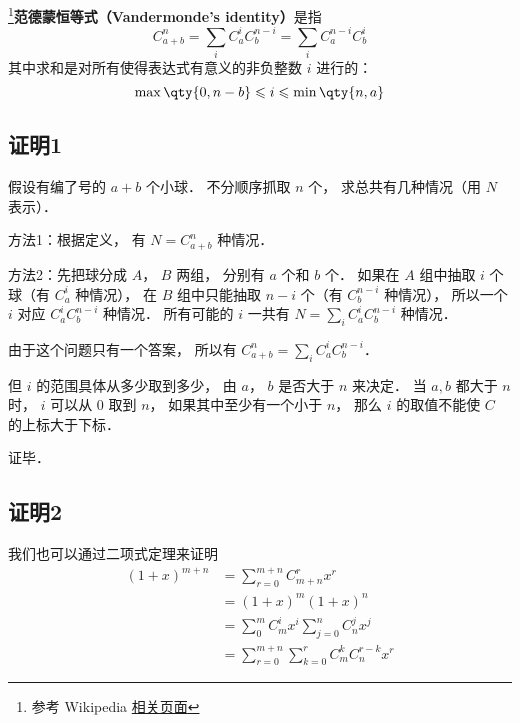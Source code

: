 

\footnote{参考 Wikipedia \href{https://en.wikipedia.org/wiki/Vandermonde's_identity}{相关页面}}\textbf{范德蒙恒等式（Vandermonde's identity）}是指
\begin{equation}
C_{a + b}^n = \sum_i C_a^i C_b^{n-i} = \sum\limits_i C_a^{n-i}C_b^i
\end{equation}
其中求和是对所有使得表达式有意义的非负整数 $i$ 进行的：
\begin{equation}
\max\qty{0, n-b} \leqslant i \leqslant \min\qty{n, a}
\end{equation}

\subsection{证明1}

假设有编了号的 $a+b$ 个小球． 不分顺序抓取 $n$ 个， 求总共有几种情况（用 $N$ 表示）．

方法1：根据定义， 有 $N = C_{a+b}^n$ 种情况．

方法2：先把球分成 $A$，  $B$ 两组， 分别有 $a$ 个和 $b$ 个． 如果在 $A$ 组中抽取 $i$ 个球（有 $C_a^i$ 种情况）， 在 $B$ 组中只能抽取  $n - i$ 个（有 $C_b^{n-i}$ 种情况）， 所以一个 $i$ 对应 $C_a^i C_b^{n-i}$ 种情况． 所有可能的 $i$ 一共有 $N = \sum_i C_a^i C_b^{n-i}$ 种情况．

由于这个问题只有一个答案， 所以有 $C_{a+b}^n = \sum_i C_a^i C_b^{n-i}$． 

但 $i$ 的范围具体从多少取到多少， 由 $a$，  $b$ 是否大于 $n$ 来决定． 当 $a,b$ 都大于 $n$ 时， $i$ 可以从 0 取到 $n$，  如果其中至少有一个小于 $n$，  那么 $i$ 的取值不能使 $C$ 的上标大于下标．

证毕．

\subsection{证明2}
我们也可以通过二项式定理来证明
\begin{equation}
\begin{aligned}
(1 + x)^{m+n} &= \sum_{r=0}^{m+n} C_{m+n}^r x^r\\
&=(1+x)^m (1+x)^n\\
&=\sum_0^m C_m^i x^i  \sum_{j=0}^n C_n^j x^j\\
&=\sum_{r=0}^{m+n} \sum_{k=0}^r C_m^k C_n^{r-k} x^r
\end{aligned}
\end{equation}
